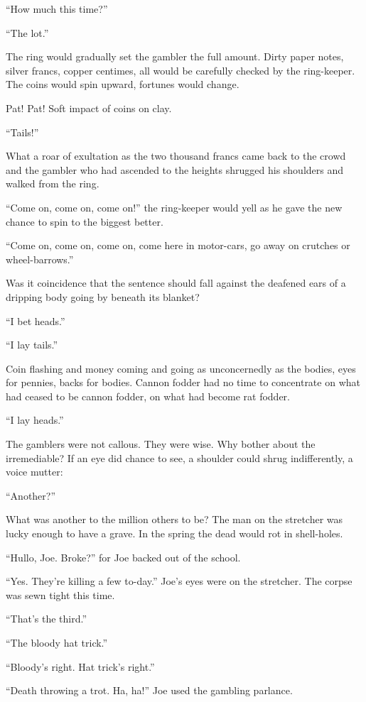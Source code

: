 ``How much this time?''

``The lot.''

The ring would gradually set the gambler the full amount. Dirty paper notes, silver francs, copper centimes, all would be carefully checked by the ring-keeper. The coins would spin upward, fortunes would change.

Pat! Pat! Soft impact of coins on clay.

``Tails!''

What a roar of exultation as the two thousand francs came back to the crowd and the gambler who had ascended to the heights shrugged his shoulders and walked from the ring.

``Come on, come on, come on!'' the ring-keeper would yell as he gave the new chance to spin to the biggest better.

``Come on, come on, come on, come here in motor-cars, go away on crutches or wheel-barrows.''

Was it coincidence that the sentence should fall against the deafened ears of a dripping body going by beneath its blanket?

``I bet heads.''

``I lay tails.''

Coin flashing and money coming and going as unconcernedly as the bodies, eyes for pennies, backs for bodies. Cannon fodder had no time to concentrate on what had ceased to be cannon fodder, on what had become rat fodder.

``I lay heads.''

The gamblers were not callous. They were wise. Why bother about the irremediable? If an eye did chance to see, a shoulder could shrug indifferently, a voice mutter:

``Another?''

What was another to the million others to be? The man on the stretcher was lucky enough to have a grave. In the spring the dead would rot in shell-holes.

``Hullo, Joe. Broke?'' for Joe backed out of the school.

``Yes. They're killing a few to-day.'' Joe's eyes were on the stretcher. The corpse was sewn tight this time.

``That's the third.''

``The bloody hat trick.''

``Bloody's right. Hat trick's right.''

``Death throwing a trot. Ha, ha!'' Joe used the gambling parlance.

